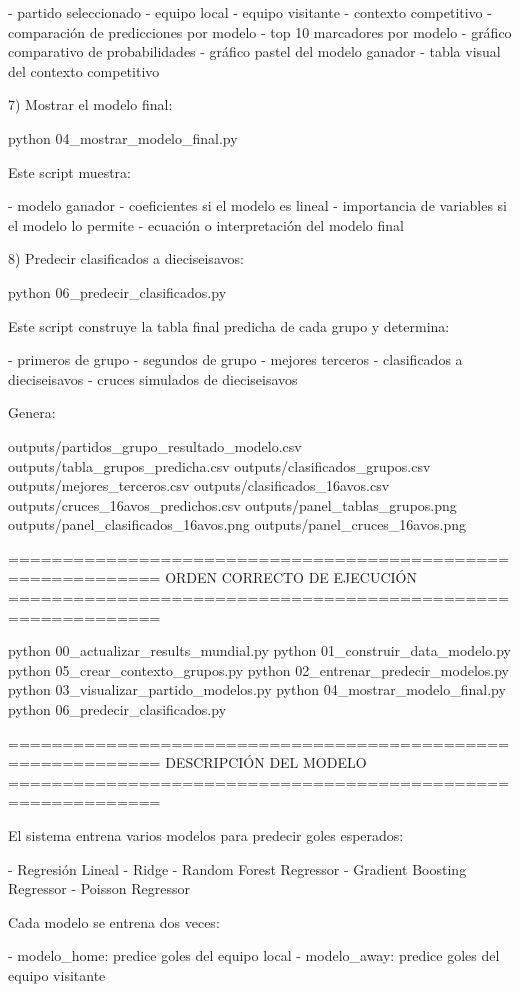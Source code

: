 - partido seleccionado
- equipo local
- equipo visitante
- contexto competitivo
- comparación de predicciones por modelo
- top 10 marcadores por modelo
- gráfico comparativo de probabilidades
- gráfico pastel del modelo ganador
- tabla visual del contexto competitivo

7) Mostrar el modelo final:

python 04_mostrar_modelo_final.py

Este script muestra:

- modelo ganador
- coeficientes si el modelo es lineal
- importancia de variables si el modelo lo permite
- ecuación o interpretación del modelo final

8) Predecir clasificados a dieciseisavos:

python 06_predecir_clasificados.py

Este script construye la tabla final predicha de cada grupo y determina:

- primeros de grupo
- segundos de grupo
- mejores terceros
- clasificados a dieciseisavos
- cruces simulados de dieciseisavos

Genera:

outputs/partidos_grupo_resultado_modelo.csv
outputs/tabla_grupos_predicha.csv
outputs/clasificados_grupos.csv
outputs/mejores_terceros.csv
outputs/clasificados_16avos.csv
outputs/cruces_16avos_predichos.csv
outputs/panel_tablas_grupos.png
outputs/panel_clasificados_16avos.png
outputs/panel_cruces_16avos.png

============================================================
ORDEN CORRECTO DE EJECUCIÓN
============================================================

python 00_actualizar_results_mundial.py
python 01_construir_data_modelo.py
python 05_crear_contexto_grupos.py
python 02_entrenar_predecir_modelos.py
python 03_visualizar_partido_modelos.py
python 04_mostrar_modelo_final.py
python 06_predecir_clasificados.py

============================================================
DESCRIPCIÓN DEL MODELO
============================================================

El sistema entrena varios modelos para predecir goles esperados:

- Regresión Lineal
- Ridge
- Random Forest Regressor
- Gradient Boosting Regressor
- Poisson Regressor

Cada modelo se entrena dos veces:

- modelo_home: predice goles del equipo local
- modelo_away: predice goles del equipo visitante

